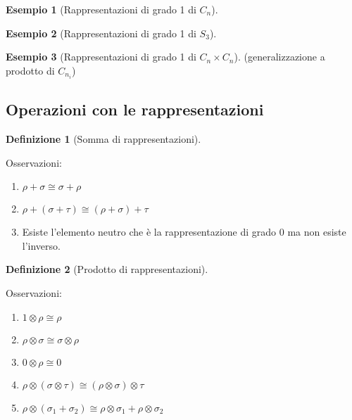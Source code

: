 \documentclass[11pt]{article}
\theoremstyle{plain}
\theoremstyle{definition}
\newtheorem{defn}{Definizione}[section]
\newtheorem{exmp}{Esempio}[section]
\theoremstyle{remark}
\begin{document}
\begin{exmp}[Rappresentazioni di grado 1 di $C_n$]

\end{exmp}


\begin{exmp}[Rappresentazioni di grado 1 di $S_3$]

\end{exmp}

\begin{exmp}[Rappresentazioni di grado 1 di $C_n \times C_n$]


(generalizzazione a prodotto di $C_{n_i}$)
\end{exmp}














\newpage
\subsection{Operazioni con le rappresentazioni}

\begin{defn}[Somma di rappresentazioni]

\label{defn:somma di rappresentazioni}
\end{defn}

Osservazioni:

\begin{enumerate}
\item $\rho + \sigma \cong \sigma + \rho$
\item $\rho + (\sigma + \tau) \cong (\rho + \sigma ) + \tau$
\item Esiste l'elemento neutro che è la rappresentazione di grado 0 ma non esiste l'inverso.

\end{enumerate}





\begin{defn}[Prodotto di rappresentazioni]

\label{defn:prodotto di rappresentazioni}
\end{defn}


Osservazioni:


\begin{enumerate}
\item $1\otimes \rho \cong \rho$
\item $\rho \otimes \sigma \cong \sigma \otimes \rho$
\item $0 \otimes \rho \cong 0$
\item $\rho \otimes (\sigma \otimes \tau) \cong (\rho \otimes \sigma)\otimes \tau$
\item $\rho \otimes (\sigma_1 + \sigma_2) \cong \rho \otimes \sigma_1 + \rho \otimes \sigma_2$

\end{enumerate}
\end{document}
